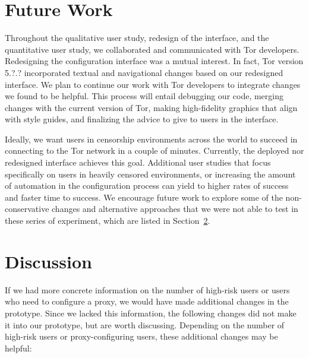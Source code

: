 \documentclass[USenglish,oneside,twocolumn]{article}
\begin{document}
\section{Future Work} 
Throughout the qualitative user study, redesign of the interface, and the quantitative user study, we collaborated and communicated with Tor developers. Redesigning the configuration interface was a mutual interest. In fact, Tor version {\color{red} 5.?.?} incorporated textual and navigational changes based on our redesigned interface. We plan to continue our work with Tor developers to integrate changes we found to be helpful. This process will entail debugging our code, merging changes with the current version of Tor, making high-fidelity graphics that align with style guides, and finalizing the advice to give to users in the interface. 

Ideally, we want users in censorship environments across the world to succeed in connecting to the Tor network in a couple of minutes. Currently, the deployed nor redesigned interface achieves this goal. Additional user studies that focus specifically on users in heavily censored environments, or increasing the amount of automation in the configuration process can yield to higher rates of success and faster time to success. We encourage future work to explore some of the non-conservative changes and alternative approaches that we were not able to test in these series of experiment, which are listed in Section~\ref{sec:discussion}. 

\section{Discussion} 
\label{sec:discussion}
If we had more concrete information on the number of high-risk users or users who need to configure a proxy, we would have made additional changes in the prototype. Since we lacked this information, the following changes did not make it into our prototype, but are worth discussing. Depending on the number of high-risk users or proxy-configuring users, these additional changes may be helpful: \\
\end{document}
